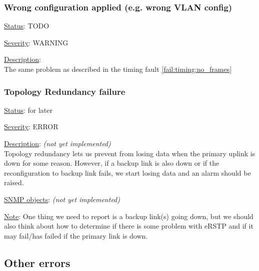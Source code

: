 \subsubsection{\bf Wrong configuration applied (e.g. wrong VLAN config)}
		\begin{pck_descr}
			\item [] \underline{Status}: TODO
			\item [] \underline{Severity}: WARNING
			\item [] \underline{Description}:\\
				The same problem as described in the timing fault
				\ref{fail:timing:no_frames}
		\end{pck_descr}

\subsubsection{\bf Topology Redundancy failure}
		\begin{pck_descr}
			\item [] \underline{Status}: for later
			\item [] \underline{Severity}: ERROR
			\item [] \underline{Description}: \emph{(not yet implemented)}\\
				Topology redundancy lets us prevent from losing data when the primary
				uplink is down for some reason. However, if a backup link is also down
				or if the reconfiguration to backup link fails, we start losing data and
				an alarm should be raised.
			\item [] \underline{SNMP objects}: \emph{(not yet implemented)}
			\item [] \underline{Note}: One thing we need to report is a backup link(s)
				going down, but we should also think about how to determine if there is
				some problem with eRSTP and if it may fail/has failed if the primary
				link is down.
		\end{pck_descr}

\newpage
\subsection{Other errors}
\label{sec:other_fail}


